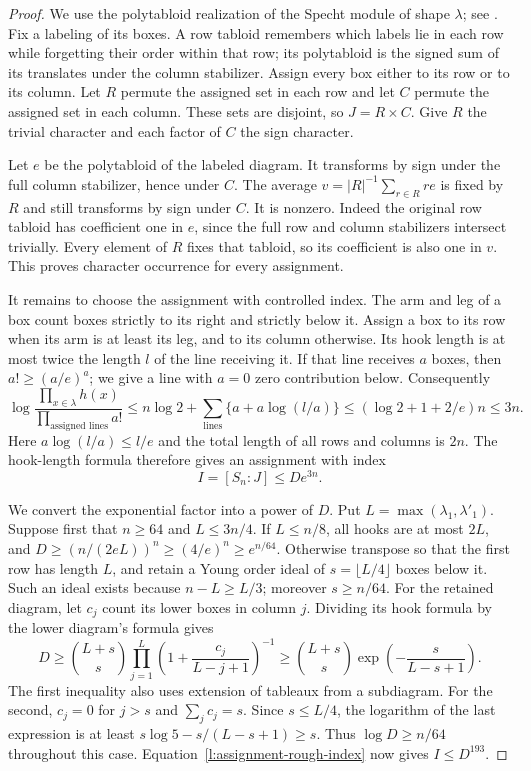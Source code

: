 \begin{proof}
We use the polytabloid realization of the Specht module of shape
$\lambda$; see \cite{sagan,etingof}.  Fix a labeling of its boxes. A row tabloid remembers which labels lie in each row while forgetting their order within that row; its polytabloid is the signed sum of its translates under the column stabilizer.
Assign every box either to its row or to its column.  Let $R$ permute
the assigned set in each row and let $C$ permute the assigned set in
each column.  These sets are disjoint, so $J=R\times C$.  Give $R$
the trivial character and each factor of $C$ the sign character.

Let $e$ be the polytabloid of the labeled diagram.  It transforms by
sign under the full column stabilizer, hence under $C$.  The average
$v=|R|^{-1}\sum_{r\in R}re$ is fixed by $R$ and still transforms by
sign under $C$.  It is nonzero.  Indeed the original row tabloid has
coefficient one in $e$, since the full row and column stabilizers
intersect trivially.  Every element of $R$ fixes that tabloid, so its
coefficient is also one in $v$.  This proves character occurrence for
every assignment.

It remains to choose the assignment with controlled index.  The arm
and leg of a box count boxes strictly to its right and strictly below
it.  Assign a box to its row when its arm is at least its leg, and to
its column otherwise.  Its hook length is at most twice the length
$l$ of the line receiving it.  If that line receives $a$ boxes, then
$a!\ge(a/e)^a$; we give a line with $a=0$ zero contribution below.
Consequently
\[
 \log\frac{\prod_{x\in\lambda}h(x)}
                  {\prod_{\text{assigned lines}}a!}
 \le n\log2+\sum_{\text{lines}}\{a+a\log(l/a)\}
 \le(\log2+1+2/e)n\le3n.
\]
Here $a\log(l/a)\le l/e$ and the total length of all rows and
columns is $2n$.  The hook-length formula therefore gives an assignment
with index
\begin{equation}\label{l:assignment-rough-index}
 I=[S_n:J]\le D e^{3n}.
\end{equation}

We convert the exponential factor into a power of $D$.  Put
$L=\max(\lambda_1,\lambda'_1)$.  Suppose first that $n\ge64$ and
$L\le3n/4$.  If $L\le n/8$, all hooks are at most $2L$, and
$D\ge(n/(2eL))^n\ge(4/e)^n\ge e^{n/64}$.
Otherwise transpose so that the first row has length $L$, and retain
a Young order ideal of $s=\lfloor L/4\rfloor$ boxes below it.
Such an ideal exists because $n-L\ge L/3$; moreover $s\ge n/64$.
For the retained diagram, let $c_j$ count its lower boxes in column
$j$.  Dividing its hook formula by the lower diagram's formula gives
\[
 D\ge\binom{L+s}s
       \prod_{j=1}^L\left(1+\frac{c_j}{L-j+1}\right)^{-1}
 \ge\binom{L+s}s\exp\left(-\frac{s}{L-s+1}\right).
\]
The first inequality also uses extension of tableaux from a subdiagram.
For the second, $c_j=0$ for $j>s$ and $\sum_jc_j=s$.
Since $s\le L/4$, the logarithm of the last expression is at least
$s\log5-s/(L-s+1)\ge s$.  Thus $\log D\ge n/64$ throughout
this case.  Equation~\eqref{l:assignment-rough-index} now gives
$I\le D^{193}$.


\end{proof}
